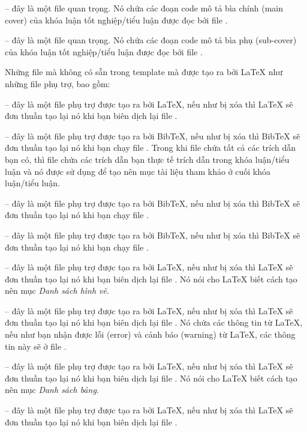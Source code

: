  -- đây là một file quan trọng. Nó chứa các đoạn code mô tả bìa chính (main cover) của khóa luận tốt nghiệp/tiểu luận được đọc bởi file .

 -- đây là một file quan trọng. Nó chứa các đoạn code mô tả bìa phụ (sub-cover) của khóa luận tốt nghiệp/tiểu luận được đọc bởi file .

Những file mà không có sẵn trong template mà được tạo ra bởi \LaTeX{} như những file phụ trợ, bao gồm:

 -- đây là một file phụ trợ được tạo ra bởi \LaTeX{}, nếu như bị xóa thì \LaTeX{} sẽ đơn thuần tạo lại nó khi bạn biên dịch lại file .

 -- đây là một file phụ trợ được tạo ra bởi BibTeX, nếu như bị xóa thì BibTeX sẽ đơn thuần tạo lại nó khi bạn chạy file . Trong khi file  chứa tất cả các trích dẫn bạn có, thì file  chứa các trích dẫn bạn thực tế trích dẫn trong khóa luận/tiểu luận và nó được sử dụng để tạo nên mục tài liệu tham khảo ở cuối khóa luận/tiểu luận.

 -- đây là một file phụ trợ được tạo ra bởi BibTeX, nếu như bị xóa thì BibTeX sẽ đơn thuần tạo lại nó khi bạn chạy file .

 -- đây là một file phụ trợ được tạo ra bởi BibTeX, nếu như bị xóa thì BibTeX sẽ đơn thuần tạo lại nó khi bạn chạy file .

 -- đây là một file phụ trợ được tạo ra bởi \LaTeX{}, nếu như bị xóa thì \LaTeX{} sẽ đơn thuần tạo lại nó khi bạn biên dịch lại file . Nó nói cho \LaTeX{} biết cách tạo nên mục \emph{Danh sách hình vẽ}.

 -- đây là một file phụ trợ được tạo ra bởi \LaTeX{}, nếu như bị xóa thì \LaTeX{} sẽ đơn thuần tạo lại nó khi bạn biên dịch lại file . Nó chứa các thông tin từ \LaTeX{}, nếu như bạn nhận được lỗi (error) và cảnh báo (warning) từ \LaTeX{}, các thông tin này sẽ ở file .

 -- đây là một file phụ trợ được tạo ra bởi \LaTeX{}, nếu như bị xóa thì \LaTeX{} sẽ đơn thuần tạo lại nó khi bạn biên dịch lại file . Nó nói cho \LaTeX{} biết cách tạo nên mục \emph{Danh sách bảng}.

 -- đây là một file phụ trợ được tạo ra bởi \LaTeX{}, nếu như bị xóa thì \LaTeX{} sẽ đơn thuần tạo lại nó khi bạn biên dịch lại file .

